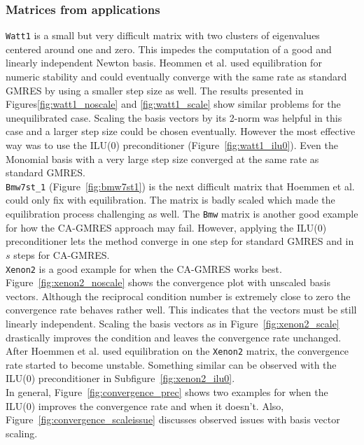 \documentclass{scrartcl}
\numberwithin{equation}{section}
\begin{document}
\subsubsection{Matrices from applications}
\texttt{Watt1} is a small but very difficult matrix with two clusters of eigenvalues centered around one and zero. This impedes the computation of a good and linearly independent Newton basis. Heommen et al. used equilibration for numeric stability and could eventually converge with the same rate as standard GMRES by using a smaller step size as well. The results presented in Figures\ref{fig:watt1_noscale} and \ref{fig:watt1_scale} show similar problems for the unequilibrated case. Scaling the basis vectors by its 2-norm was helpful in this case and a larger step size could be chosen eventually. However the most effective way was to use the ILU(0) preconditioner (Figure~\ref{fig:watt1_ilu0}). Even the Monomial basis with a very large step size converged at the same rate as standard GMRES.\\

\texttt{Bmw7st\_1} (Figure~\ref{fig:bmw7st1}) is the next difficult matrix that Hoemmen et al. could only fix with equilibration. The matrix is badly scaled which made the equilibration process challenging as well. The \texttt{Bmw} matrix is another good example for how the CA-GMRES approach may fail. However, applying the ILU(0) preconditioner lets the method converge in one step for standard GMRES and in $s$ steps for CA-GMRES.\\

\texttt{Xenon2} is a good example for when the CA-GMRES works best. Figure~\ref{fig:xenon2_noscale} shows the convergence plot with unscaled basis vectors. Although the reciprocal condition number is extremely close to zero the convergence rate behaves rather well. This indicates that the vectors must be still linearly independent. Scaling the basis vectors as in Figure~\ref{fig:xenon2_scale} drastically improves the condition and leaves the convergence rate unchanged.\\

After Hoemmen et al. used equilibration on the \texttt{Xenon2} matrix, the convergence rate started to become unstable. Something similar can be observed with the ILU(0) preconditioner in Subfigure~\ref{fig:xenon2_ilu0}.\\
In general, Figure~\ref{fig:convergence_prec} shows two examples for when the ILU(0) improves the convergence rate and when it doesn't. Also, Figure~\ref{fig:convergence_scaleissue} discusses observed issues with basis vector scaling.
\end{document}
